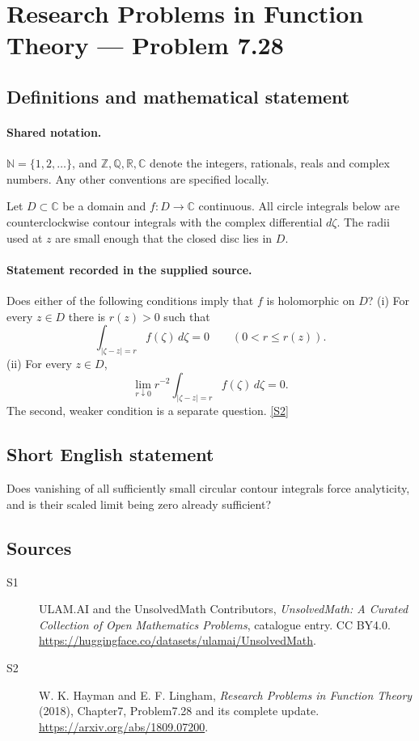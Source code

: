 \documentclass[11pt]{article}
\newcommand{\sref}[2]{\hyperlink{source:#1:#2}{[S#2]}}
\begin{document}
\section{Research Problems in Function Theory — Problem 7.28}\label{statement}

\subsection{Definitions and mathematical statement}

\paragraph{Shared notation.}$\mathbb N=\{1,2,\ldots\}$, and $\mathbb Z,\mathbb Q,\mathbb R,\mathbb C$ denote the integers, rationals, reals and complex numbers. Any other conventions are specified locally.


Let $D\subset\mathbb C$ be a domain and $f:D\to\mathbb C$ continuous. All circle integrals below are counterclockwise contour integrals with the complex differential $d\zeta$. The radii used at $z$ are small enough that the closed disc lies in $D$.

\paragraph{Statement recorded in the supplied source.}
Does either of the following conditions imply that $f$ is holomorphic on $D$?
(i) For every $z\in D$ there is $r(z)>0$ such that
\[\int_{|\zeta-z|=r}f(\zeta)\,d\zeta=0\qquad(0<r\le r(z)).\]
(ii) For every $z\in D$,
\[\lim_{r\downarrow0}r^{-2}\int_{|\zeta-z|=r}f(\zeta)\,d\zeta=0.\]
The second, weaker condition is a separate question. \sref{statement}{2}

\subsection{Short English statement}
Does vanishing of all sufficiently small circular contour integrals force analyticity, and is their scaled limit being zero already sufficient?
\subsection{Sources}
\begin{description}
\item[\hypertarget{source:statement:1}{S1}] ULAM.AI and the UnsolvedMath Contributors, \emph{UnsolvedMath: A Curated Collection of Open Mathematics Problems}, catalogue entry. CC BY4.0. \url{https://huggingface.co/datasets/ulamai/UnsolvedMath}.
\item[\hypertarget{source:statement:2}{S2}] W. K. Hayman and E. F. Lingham, \emph{Research Problems in Function Theory} (2018), Chapter7, Problem7.28 and its complete update. \url{https://arxiv.org/abs/1809.07200}.
\end{description}
\label{end:statement}
\end{document}
